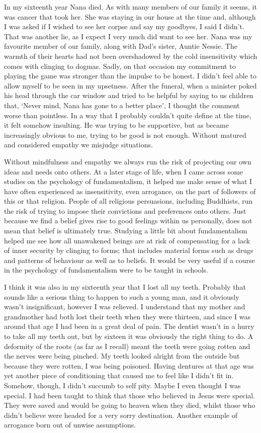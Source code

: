 In my sixteenth year Nana died. As with many members of our family it
seems, it was cancer that took her. She was staying in our house at the
time and, although I was asked if I wished to see her corpse and say my
goodbyes, I said I didn't. That was another lie, as I expect I very much
did want to see her. Nana was my favourite member of our family, along
with Dad's sister, Auntie Nessie. The warmth of their hearts had not
been overshadowed by the cold insensitivity which comes with clinging to
dogmas. Sadly, on that occasion my commitment to playing the game was
stronger than the impulse to be honest. I didn't feel able to allow
myself to be seen in my upsetness. After the funeral, when a minister
poked his head through the car window and tried to be helpful by saying
to us children that, `Never mind, Nana has gone to a better place', I
thought the comment worse than pointless. In a way that I probably
couldn't quite define at the time, it felt somehow insulting. He was
trying to be supportive, but as became increasingly obvious to me,
trying to be good is not enough. Without matured and considered empathy
we misjudge situations.

Without mindfulness and empathy we always run the risk of projecting our
own ideas and needs onto others. At a later stage of life, when I came
across some studies on the psychology of fundamentalism, it helped me
make sense of what I have often experienced as insensitivity, even
arrogance, on the part of followers of this or that religion. People of
all religious persuasions, including Buddhists, run the risk of trying
to impose their convictions and preferences onto others. Just because we
find a belief gives rise to good feelings within us personally, does not
mean that belief is ultimately true. Studying a little bit about
fundamentalism helped me see how all unawakened beings are at risk of
compensating for a lack of inner security by clinging to forms; that
includes material forms such as drugs and patterns of behaviour as well
as to beliefs. It would be very useful if a course in the psychology of
fundamentalism were to be taught in schools.

I think it was also in my sixteenth year that I lost all my teeth.
Probably that sounds like a serious thing to happen to such a young man,
and it obviously wasn't insignificant, however I was relieved. I
understand that my mother and grandmother had both lost their teeth when
they were thirteen, and since I was around that age I had been in a
great deal of pain. The dentist wasn't in a hurry to take all my teeth
out, but by sixteen it was obviously the right thing to do. A deformity
of the roots (as far as I recall) meant the teeth were going rotten and
the nerves were being pinched. My teeth looked alright from the outside
but because they were rotten, I was being poisoned. Having dentures at
that age was yet another piece of conditioning that caused me to feel
like I didn't fit in. Somehow, though, I didn't succumb to self pity.
Maybe I even thought I was special. I had been taught to think that
those who believed in Jesus were special. They were saved and would be
going to heaven when they died, whilst those who didn't believe were
headed for a very sorry destination. Another example of arrogance born
out of unwise assumptions.

